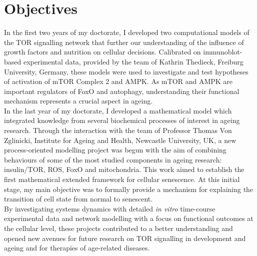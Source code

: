 \section{Objectives}
\label{sec:Objectives}
In the first two years of my doctorate, I developed two computational models of the TOR signalling network that further our understanding of the influence of growth factors and nutrition on cellular decisions. Calibrated on immunoblot-based experimental data, provided by the team of Kathrin Thedieck, Freiburg University, Germany, these models were used to investigate and test hypotheses of activation of mTOR Complex 2 and AMPK. As mTOR and AMPK are important regulators of FoxO and autophagy, understanding their functional mechanism represents a crucial aspect in ageing.\\
In the last year of my doctorate, I developed a mathematical model which integrated knowledge from several biochemical processes of interest in ageing research. Through the interaction with the team of Professor Thomas Von Zglinicki, Institute for Ageing and Health, Newcastle University, UK, a new process-oriented modelling project was begun with the aim of combining behaviours of some of the most studied components in ageing research: insulin/TOR, ROS, FoxO and mitochondria. This work aimed to establish the first mathematical extended framework for cellular senescence. At this initial stage, my main objective was to formally provide a mechanism for explaining the transition of cell state from normal to senescent.\\
By investigating systems dynamics with detailed \emph{in vitro} time-course experimental data and network modelling with a focus on functional outcomes at the cellular level, these projects contributed to a better understanding and opened new avenues for future research on TOR signalling in development and ageing and for therapies of age-related diseases.

